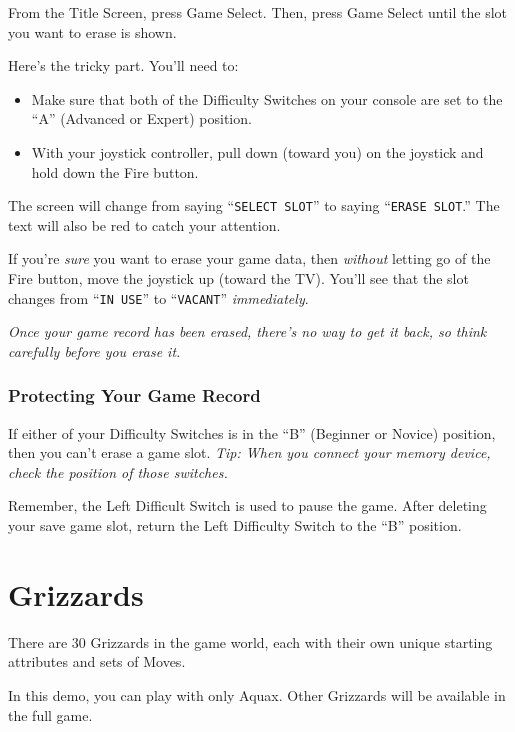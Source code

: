 \documentclass[12pt,openright,book]{memoir}
\begin{document}
\begin{description}
From the Title Screen, press Game  Select. Then, press Game Select until
the slot you want to erase is shown.

Here's the tricky part. You'll need to:

\begin{itemize}
\item Make sure that both of the Difficulty Switches on your console
  are set to the ``A'' (Advanced or Expert) position.
\item With your joystick controller, pull down (toward you) on the
  joystick and hold down the Fire button.
\end{itemize}

The screen  will change from  saying ``\texttt{SELECT SLOT}''  to saying
``\texttt{ERASE  SLOT}.''   The  text   will  also   be  red   to  catch
your attention.

If  you're  \emph{sure}   you  want  to  erase  your   game  data,  then
\emph{without}  letting go  of the  Fire  button, move  the joystick  up
(toward  the TV).  You'll see  that the  slot changes  from ``\texttt{IN
  USE}'' to ``\texttt{VACANT}'' \emph{immediately}.

\emph{Once your  game record has been  erased, there's no way  to get it
  back, so think carefully before you erase it.}

\subsection{Protecting Your Game Record}

If  either of  your Difficulty  Switches is  in the  ``B'' (Beginner  or
Novice) position, then you can't erase  a game slot. \emph{Tip: When you
  connect your memory device, check the position of those switches.}

\ifdefined\TVSECAM
Remember,  the  Left  Difficult  Switch  is  used  to  pause  the  game.
After deleting your save game slot, return the Left Difficulty Switch to
the ``B'' position.
\fi

\chapter{Grizzards}

There are  30 Grizzards in  the game world,  each with their  own unique
starting attributes and sets of Moves.

\ifdefined\DEMO

In this  demo, you  can play  with only Aquax.  Other Grizzards  will be
available in the full game.


\end{description}
\end{document}
